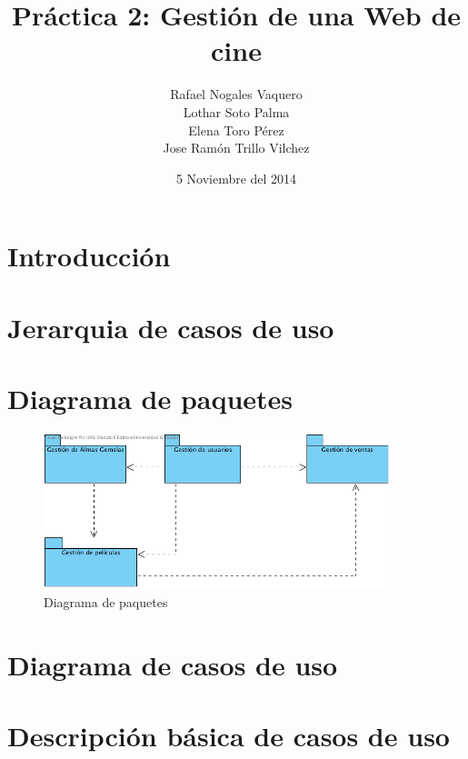 \documentclass{article}
\title{Práctica 2: Gestión de una Web de cine}
\author{Rafael Nogales Vaquero
\\Lothar Soto Palma
\\Elena Toro Pérez
\\Jose Ramón Trillo Vilchez}
\date{5 Noviembre del 2014}
\begin{document}
\maketitle

\section{Introducción}
\section{Jerarquia de casos de uso}
\section{Diagrama de paquetes}
\begin{figure}[!ht]
\begin{center}
  \includegraphics[width=0.9\textwidth]{Paquetes.png}
  \caption{Diagrama de paquetes}
\end{center}
\end{figure}

\section{Diagrama de casos de uso}
\section{Descripción básica de casos de uso}
\end{document}
